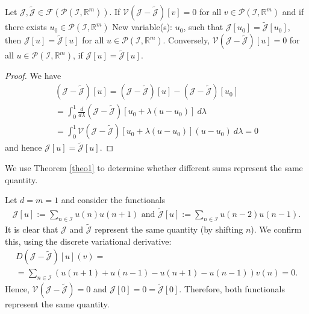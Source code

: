\documentclass[runningheads]{llncs}
\newcommand{\1}{\chi}
\begin{document}
\begin{theorem}\label{theo1}
	Let \(\mathcal{J},\tilde{\mathcal{J}}\in \mathcal{F}(\mathcal{P}(\mathcal{I},\mathbb{R}^m))\). If \(\mathcal{V}(\mathcal{J}-\tilde{\mathcal{J}})[v]=0\) for all \(v\in\mathcal{P}(\mathcal{I},\mathbb{R}^m)\) and if there exists \(u_0\in\mathcal{P}(\mathcal{I},\mathbb{R}^m)\)
{\color{blue} New variable(s): \(u_0\),  }
 such that \(\mathcal{J}[u_0]=\tilde{\mathcal{J}}[u_0]\), then
	\(\mathcal{J}[u]=\tilde{\mathcal{J}}[u]\)
	for all \(u\in\mathcal{P}(\mathcal{I},\mathbb{R}^m)\).
	Conversely,
	\(\mathcal{V}(\mathcal{J}-\tilde{\mathcal{J}})[u]=0\)
	for all \(u\in\mathcal{P}(\mathcal{I},\mathbb{R}^m)\), if \(\mathcal{J}[u]=\tilde{\mathcal{J}}[u]\).
\end{theorem}
\begin{proof}
	We have
	\begin{gather*}
		(\mathcal{J}-\tilde{\mathcal{J}})[u]=(\mathcal{J}-\tilde{\mathcal{J}})[u]-(\mathcal{J}-\tilde{\mathcal{J}})[u_0]\\
		=\int_{0}^{1}\frac{d}{d\lambda}(\mathcal{J}-\tilde{\mathcal{J}})[u_0+\lambda(u-u_0)]\ d\lambda\\
		=\int_{0}^{1}\mathcal{V}(\mathcal{J}-\tilde{\mathcal{J}})[u_0+\lambda(u-u_0)](u-u_0)\ d\lambda=0
	\end{gather*}
	and hence \(\mathcal{J}[u]=\tilde{\mathcal{J}}[u]\).
\end{proof}
We use Theorem \ref{theo1} to determine whether different sums represent the same quantity.
\begin{example}
	Let \(d=m=1\) and consider the functionals
	\begin{gather*}
		\mathcal{J}[u]:=\sum_{n\in\mathcal{I}}u(n)u(n+1)\text{ and }
		\tilde{\mathcal{J}}[u]:=\sum_{n\in\mathcal{I}}u(n-2)u(n-1).
	\end{gather*}
	It is clear that \(\mathcal{J}\) and \(\tilde{\mathcal{J}}\) represent the same quantity (by shifting \(n\)). We confirm this, using the discrete variational derivative:
	\begin{gather*}
		D(\mathcal{J}-\tilde{\mathcal{J}})[u](v)=\\
		=\sum_{n\in\mathcal{I}}(u(n+1)+u(n-1)-u(n+1)-u(n-1))v(n)=0.
	\end{gather*}
	Hence, \(\mathcal{V}(\mathcal{J}-\tilde{\mathcal{J}})=0\) and \(\mathcal{J}[0]=0=\tilde{\mathcal{J}}[0]\). Therefore, both functionals represent the same quantity.
\end{example}
\end{document}
